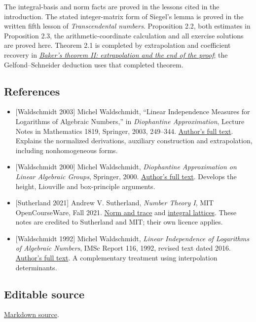 \documentclass[
  11pt,
  a4paper,
]{article}
\providecommand{\tightlist}{%
  \setlength{\itemsep}{0pt}\setlength{\parskip}{0pt}}
\begin{document}
The integral-basis and norm facts are proved in the lessons cited in the
introduction. The stated integer-matrix form of Siegel's lemma is proved
in the written fifth lesson of \emph{Transcendental numbers}.
Proposition 2.2, both estimates in Proposition 2.3, the
arithmetic-coordinate calculation and all exercise solutions are proved
here. Theorem 2.1 is completed by extrapolation and coefficient recovery
in \href{https://kokunoyumeto.github.io/open-math-courses-public/courses/TR-BAKER/TR-BAKER-03.html}{\emph{Baker's theorem II: extrapolation
and the end of the proof}}; the Gelfond--Schneider deduction uses that
completed theorem.

\subsection{References}\label{references}

\begin{itemize}
\tightlist
\item
  {[}Waldschmidt 2003{]} Michel Waldschmidt, ``Linear Independence
  Measures for Logarithms of Algebraic Numbers,'' in \emph{Diophantine
  Approximation}, Lecture Notes in Mathematics 1819, Springer, 2003,
  249--344.
  \href{https://webusers.imj-prg.fr/~michel.waldschmidt/articles/pdf/SpringerLN1819-2003.pdf}{Author's
  full text}. Explains the normalized derivations, auxiliary
  construction and extrapolation, including nonhomogeneous forms.
\item
  {[}Waldschmidt 2000{]} Michel Waldschmidt, \emph{Diophantine
  Approximation on Linear Algebraic Groups}, Springer, 2000.
  \href{https://webusers.imj-prg.fr/~michel.waldschmidt/articles/pdf/dalag.pdf}{Author's
  full text}. Develops the height, Liouville and box-principle
  arguments.
\item
  {[}Sutherland 2021{]} Andrew V. Sutherland, \emph{Number Theory I},
  MIT OpenCourseWare, Fall 2021.
  \href{https://ocw.mit.edu/courses/18-785-number-theory-i-fall-2021/mit18_785f21_lec4.pdf}{Norm
  and trace} and
  \href{https://ocw.mit.edu/courses/18-785-number-theory-i-fall-2021/mit18_785f21_lec5.pdf}{integral
  lattices}. These notes are credited to Sutherland and MIT; their own
  licence applies.
\item
  {[}Waldschmidt 1992{]} Michel Waldschmidt, \emph{Linear Independence
  of Logarithms of Algebraic Numbers}, IMSc Report 116, 1992, revised
  text dated 2016.
  \href{https://webusers.imj-prg.fr/~michel.waldschmidt/articles/pdf/LIL.pdf}{Author's
  full text}. A complementary treatment using interpolation
  determinants.
\end{itemize}

\subsection{Editable source}\label{editable-source}

\href{https://kokunoyumeto.github.io/open-math-courses-public/courses/TR-BAKER/src/TR-BAKER-02.md}{Markdown source}.
\end{document}
